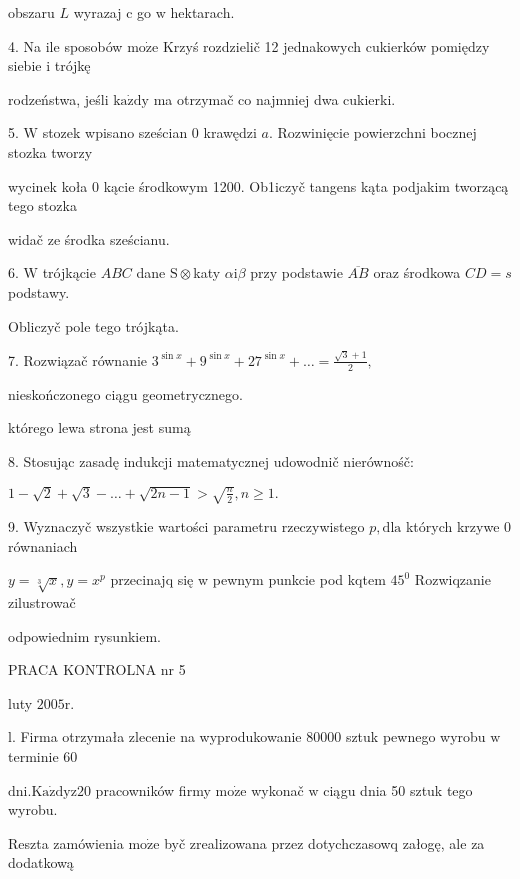 \documentclass[a4paper,12pt]{article}
\begin{document}
obszaru $L$ wyrazaj $\mathrm{c}$ go $\mathrm{w}$ hektarach.

4. Na ile sposobów $\mathrm{m}\mathrm{o}\dot{\mathrm{z}}\mathrm{e}$ Krzyś rozdzielič 12 jednakowych cukierków pomiędzy siebie $\mathrm{i}$ trójkę

rodzeństwa, jeśli $\mathrm{k}\mathrm{a}\dot{\mathrm{z}}\mathrm{d}\mathrm{y}$ ma otrzymač co najmniej dwa cukierki.

5. $\mathrm{W}$ stozek wpisano sześcian $0$ krawędzi $a$. Rozwinięcie powierzchni bocznej stozka tworzy

wycinek koła $0$ kącie środkowym 1200. Ob1iczyč tangens kąta podjakim tworzącą tego stozka

widač ze środka sześcianu.

6. $\mathrm{W}$ trójkącie $ABC$ dane $\mathrm{S}\otimes$katy $\alpha \mathrm{i}\beta$ przy podstawie $\overline{AB}$ oraz środkowa $CD=s$ podstawy.

Obliczyč pole tego trójkąta.

7. Rozwiązač równanie $3^{\sin x}+9^{\sin x}+27^{\sin x}+\ldots= \displaystyle \frac{\sqrt{3}+1}{2},$

nieskończonego ciągu geometrycznego.

którego lewa strona jest sumą

8. Stosując zasadę indukcji matematycznej udowodnič nierównośč:

$1-\sqrt{2}+\sqrt{3}-\ldots+\sqrt{2n-1}>\sqrt{\frac{n}{2}},n\geq 1.$

9. Wyznaczyč wszystkie wartości parametru rzeczywistego $p, \mathrm{d}\mathrm{l}\mathrm{a}$ których krzywe $0$ równaniach

$y=\sqrt[3]{x}, y=x^{p}$ przecinajq się $\mathrm{w}$ pewnym punkcie pod kqtem $45^{0}$ Rozwiqzanie zilustrowač

odpowiednim rysunkiem.





PRACA KONTROLNA nr 5

luty $2005\mathrm{r}.$

l. Firma otrzymała zlecenie na wyprodukowanie 80000 sztuk pewnego wyrobu $\mathrm{w}$ terminie 60

$\mathrm{d}\mathrm{n}\mathrm{i}. \mathrm{K}\mathrm{a}\dot{\mathrm{z}}\mathrm{d}\mathrm{y} \mathrm{z} 20$ pracowników firmy $\mathrm{m}\mathrm{o}\dot{\mathrm{z}}\mathrm{e}$ wykonač $\mathrm{w}$ ciągu dnia 50 sztuk tego wyrobu.

Reszta zamówienia $\mathrm{m}\mathrm{o}\dot{\mathrm{z}}\mathrm{e}$ byč zrealizowana przez dotychczasowq załogę, ale za dodatkową
\end{document}
